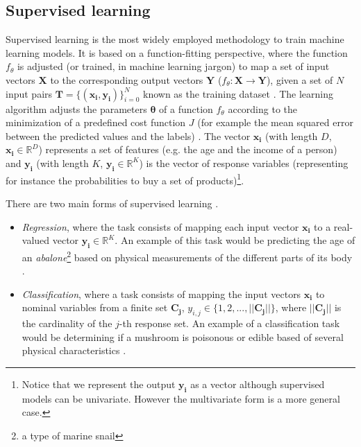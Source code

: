 \subsection{Supervised learning}
Supervised learning is the most widely employed methodology to train machine learning models. It is based on a function-fitting perspective, where the function $f_\theta$ is adjusted (or trained, in machine learning jargon) to map a set of input vectors $\mathbf{X}$ to the corresponding output vectors $\mathbf{Y}$ ($f_\theta:\mathbf{X}\rightarrow \mathbf{Y}$), given a set of $N$ input pairs $\mathbf{T}=\{(\mathbf{x_i},\mathbf{y_i})\}_{i=0}^{N}$ known as the training dataset \autocite{theodoridis2015}. The learning algorithm adjusts the parameters $\mathbf{\theta}$ of a function $f_\theta$ according to the minimization of a predefined cost function $J$ (for example the mean squared error between the predicted values and the labels) \autocite{hastie2009}. The vector $\mathbf{x_i}$ (with length $D$, $\mathbf{x_i} \in \mathbb{R}^D$) represents a set of features (e.g. the age and the income of a person)  and $\mathbf{y_i}$ (with length $K$, $\mathbf{y_i}\in\mathbb{R}^K$) is the vector of response variables (representing for instance the probabilities to buy a set of products)\footnote{Notice that we represent the output $\mathbf{y_i}$ as a vector although supervised models can be univariate. However the multivariate form is a more general case.}.

There are two main forms of supervised learning  \autocite{murphy2012}.

\begin{itemize}
	\item \textit{Regression}, where the task consists of mapping each input vector $\mathbf{x_i}$ to a real-valued vector $\mathbf{y_i} \in \mathbb{R}^K$. An example of this task would be predicting the age of an \textit{abalone}\footnote{a type of marine snail} based on physical measurements of the different parts of its body \autocite{dua2019abalone}.
	\item \textit{Classification}, where a task consists of mapping the input vectors $\mathbf{x_i}$ to nominal variables from a finite set $\mathbf{C_j}$, $y_{i,j} \in \{1,2,...,||\mathbf{C_j}||\}$, where $||\mathbf{C_j}||$ is the cardinality of the $j$-th response set. An example of a classification task would be determining if a mushroom is poisonous or edible based of several physical characteristics \autocite{dua2019abalone}.
\end{itemize}


